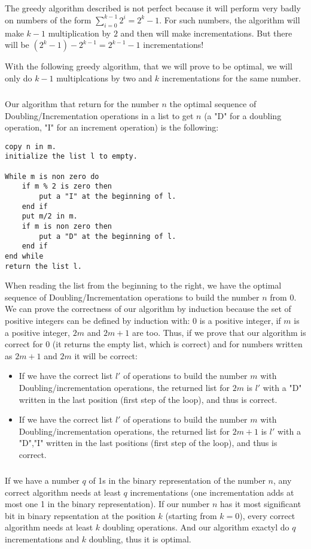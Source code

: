 \subparagraph{}
The greedy algorithm described is not perfect because it will perform very badly on numbers of the form $\sum\limits_{i=0}^{k-1} 2^i = 2^k-1$. For such numbers, the algorithm will make $k-1$ multiplication by $2$ and then will make incrementations. But there will be $(2^k-1)-2^{k-1}=2^{k-1}-1$ incrementations!

With the following greedy algorithm, that we will prove to be optimal, we will only do $k-1$ multiplcations by two and $k$ incrementations for the same number.

\subparagraph{}
Our algorithm that return for the number $n$ the optimal sequence of Doubling/Incrementation operations in a list to get $n$ (a "D" for a doubling operation, "I" for an increment operation) is the following:
\begin{verbatim}
copy n in m.
initialize the list l to empty.

While m is non zero do
    if m % 2 is zero then
        put a "I" at the beginning of l.
    end if
    put m/2 in m.
    if m is non zero then
        put a "D" at the beginning of l.
    end if
end while
return the list l.
\end{verbatim}
When reading the list from the beginning to the right, we have the optimal sequence of Doubling/Incrementation operations to build the number $n$ from $0$.
We can prove the correctness of our algorithm by induction because the set of positive integers can be defined by induction with: $0$ is a positive integer, if $m$ is a positive integer, $2m$ and $2m+1$ are too. Thus, if we prove that our algorithm is correct for $0$ (it returns the empty list, which is correct) and for numbers written as $2m+1$ and $2m$ it will be correct:
\begin{itemize}
\item If we have the correct list $l'$ of operations to build the number $m$ with Doubling/incrementation operations, the returned list for $2m$ is $l'$ with a "D" written in the last position (first step of the loop), and thus is correct.
\item If we have the correct list $l'$ of operations to build the number $m$ with Doubling/incrementation operations, the returned list for $2m+1$ is $l'$ with a "D","I" written in the last positions (first step of the loop), and thus is correct.
\end{itemize}

\subparagraph{}
If we have a number $q$ of 1s in the binary representation of the number $n$, any correct algorithm needs at least $q$ incrementations (one incrementation adds at most one 1 in the binary representation).
If our number $n$ has it most significant bit in binary repsentation at the position $k$ (starting from $k=0$), every correct algorithm needs at least $k$ doubling operations.
And our algorithm exactyl do $q$ incrementations and $k$ doubling, thus it is optimal.